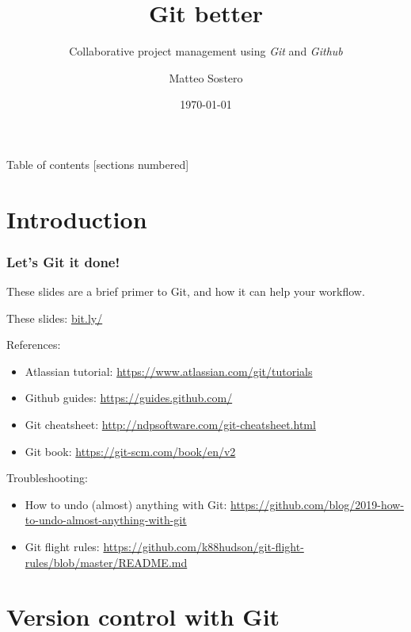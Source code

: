 \documentclass[10pt,svgnames]{beamer}
\title{Git better}
\subtitle{Collaborative project management using \emph{Git} and \emph{Github}}
\date{\today}
\author{Matteo Sostero}
\institute{Sant'Anna School of Advanced Studies}
\begin{document}
\maketitle

\begin{frame}{Table of contents}
  [sections numbered]
  \tableofcontents[hideallsubsections]
\end{frame}

\section{Introduction}

\begin{frame}
\frametitle{Let's Git it done!}
    
These slides are a brief primer to Git, and how it can help your workflow.\medskip

\centerline{These slides: \url{bit.ly/}}
\medskip
\pause

References:
\begin{itemize}
  \item Atlassian tutorial: \url{https://www.atlassian.com/git/tutorials}
  \item Github guides: \url{https://guides.github.com/}
  \item Git cheatsheet: \url{http://ndpsoftware.com/git-cheatsheet.html}
  \item Git book: \url{https://git-scm.com/book/en/v2}
\end{itemize}
\medskip

Troubleshooting:
\begin{itemize}
  \item How to undo (almost) anything with Git: \url{https://github.com/blog/2019-how-to-undo-almost-anything-with-git}
  \item Git flight rules: \url{https://github.com/k88hudson/git-flight-rules/blob/master/README.md}
\end{itemize}
\end{frame}



\section{Version control with Git}
\end{document}
